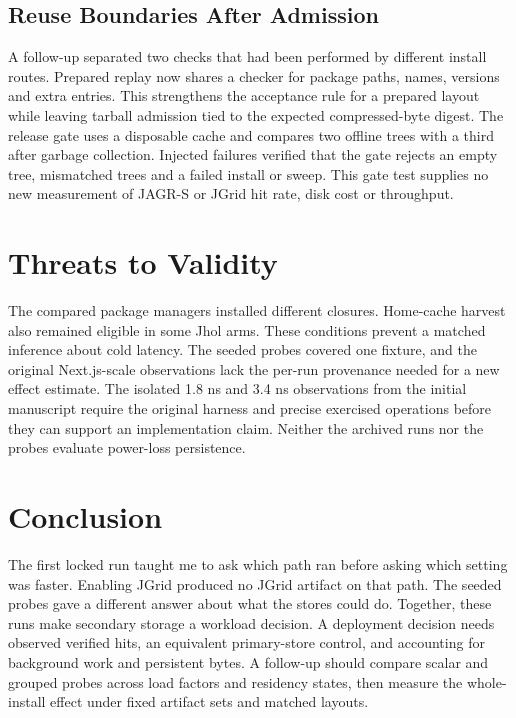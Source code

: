 \documentclass[
  11pt,
  letterpaper,
]{article}
\begin{document}
\subsection{Reuse Boundaries After
Admission}\label{reuse-boundaries-after-admission}

A follow-up separated two checks that had been performed by different
install routes. Prepared replay now shares a checker for package paths,
names, versions and extra entries. This strengthens the acceptance rule
for a prepared layout while leaving tarball admission tied to the
expected compressed-byte digest. The release gate uses a disposable
cache and compares two offline trees with a third after garbage
collection. Injected failures verified that the gate rejects an empty
tree, mismatched trees and a failed install or sweep. This gate test
supplies no new measurement of JAGR-S or JGrid hit rate, disk cost or
throughput.

\section{Threats to Validity}\label{threats-to-validity}

The compared package managers installed different closures. Home-cache
harvest also remained eligible in some Jhol arms. These conditions
prevent a matched inference about cold latency. The seeded probes
covered one fixture, and the original Next.js-scale observations lack
the per-run provenance needed for a new effect estimate. The isolated
1.8 ns and 3.4 ns observations from the initial manuscript require the
original harness and precise exercised operations before they can
support an implementation claim. Neither the archived runs nor the
probes evaluate power-loss persistence.

\section{Conclusion}\label{conclusion}

The first locked run taught me to ask which path ran before asking which
setting was faster. Enabling JGrid produced no JGrid artifact on that
path. The seeded probes gave a different answer about what the stores
could do. Together, these runs make secondary storage a workload
decision. A deployment decision needs observed verified hits, an
equivalent primary-store control, and accounting for background work and
persistent bytes. A follow-up should compare scalar and grouped probes
across load factors and residency states, then measure the whole-install
effect under fixed artifact sets and matched layouts.
\end{document}
